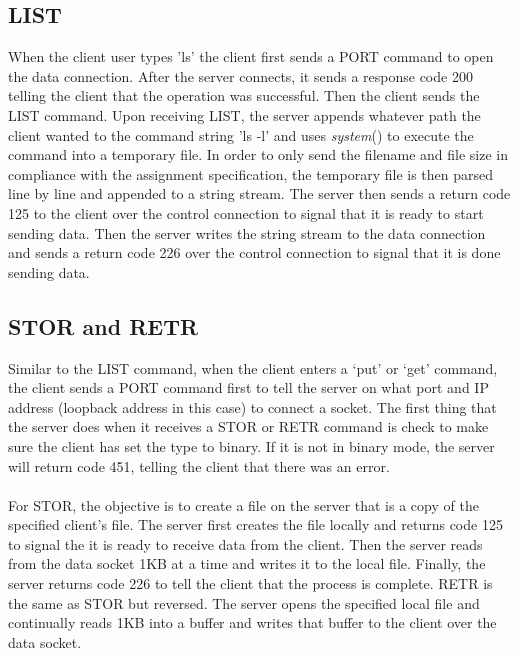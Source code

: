 \documentclass[12pt,letter,titlepage]{article}
\begin{document}
\subsection*{LIST}{
When the client user types 'ls' the client first sends a {\color{orange}PORT} command to open the data connection. After the server connects, it sends a response code 200 telling the client that the operation was successful. Then the client sends the {\color{orange}LIST} command. Upon receiving {\color{orange}LIST}, the server appends whatever path the client wanted to the command string 'ls -l' and uses {\color{cyan}\textit{system}}() to execute the command into a temporary file. In order to only send the filename and file size in compliance with the assignment specification, the temporary file is then parsed line by line and appended to a string stream. The server then sends a return code 125 to the client over the control connection to signal that it is ready to start sending data. Then the server writes the string stream to the data connection and sends a return code 226 over the control connection to signal that it is done sending data.
}

\subsection*{STOR and RETR}{
Similar to the {\color{orange}LIST} command, when the client enters a `put' or `get' command, the client sends a {\color{orange}PORT} command first to tell the server on what port and IP address (loopback address in this case) to connect a socket. The first thing that the server does when it receives a {\color{orange}STOR} or {\color{orange}RETR} command is check to make sure the client has set the type to binary. If it is not in binary mode, the server will return code 451, telling the client that there was an error. \\ \\
For {\color{orange}STOR}, the objective is to create a file on the server that is a copy of the specified client's file. The server first creates the file locally and returns code 125 to signal the it is ready to receive data from the client. Then the server reads from the data socket 1KB at a time and writes it to the local file. Finally, the server returns code 226 to tell the client that the process is complete. {\color{orange}RETR} is the same as {\color{orange}STOR} but reversed. The server opens the specified local file and continually reads 1KB into a buffer and writes that buffer to the client over the data socket.
}
\pagebreak
\end{document}
